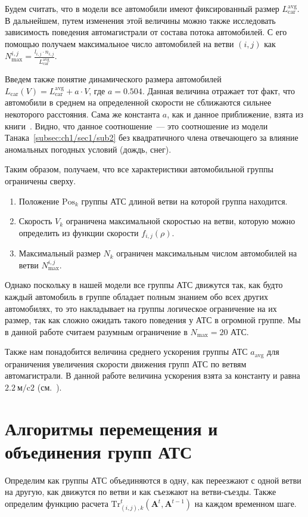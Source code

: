 Будем считать, что в модели все автомобили имеют фиксированный размер \(L_\text{car}^\text{avg}\).
В дальнейшем, путем изменения этой величины можно также исследовать зависимость поведения автомагистрали от состава потока автомобилей.
С его помощью получаем максимальное число автомобилей на ветви \((i,j)\) как \(N^{i,j}_\text{max} = \frac{l_{i,j} \cdot n_{i, j}}{L_\text{car}^\text{avg}}\).

Введем также понятие динамического размера автомобилей \(L_\text{car}(V) = L_\text{car}^\text{avg} + a\cdot V\), где \(a = 0.504\). 
Данная величина отражает тот факт, что автомобили в среднем на определенной скорости не сближаются сильнее некоторого расстояния. 
Сама же константа \(a\), как и данное приближение, взята из книги~\cite{gasn2017introd}.
Видно, что данное соотношение~--- это соотношение из модели Танака~\ref{subsec:ch1/sec1/sub2} без квадратичного члена отвечающего за влияние аномальных погодных условий (дождь, снег).

Таким образом, получаем, что все характеристики автомобильной группы ограничены сверху.
\begin{enumerate}
  \item Положение \(\mathrm{Pos}_k\) группы АТС длиной ветви на которой группа находится.
  \item Скорость \(V_k\) ограничена максимальной скоростью на ветви, которую можно определить из функции скорости $f_{i,j}(\rho)$.
  \item Максимальный размер \(N_k\) ограничен максимальным числом автомобилей на ветви \(N^{i,j}_\text{max}\).
\end{enumerate}

Однако поскольку в нашей модели все группы АТС движутся так, как будто каждый автомобиль в группе обладает полным знанием обо всех других автомобилях, то это накладывает на группы логическое ограничение на их размер, так как сложно ожидать такого поведения у АТС в огромной группе. 
Мы в данной работе считаем разумным ограничение в \(N_\text{max} = 20\) АТС.

Также нам понадобится величина среднего ускорения группы АТС \(a_\text{avg}\) для ограничения увеличения скорости движения групп АТС по ветвям автомагистрали. 
В данной работе величина ускорения взята за константу и равна \(2.2\ \text{м/c2}\) (см.~\cite{long2000acceleration}).


\section{Алгоритмы перемещения и объединения групп АТС}
\label{sec:calc_functions}
Определим как группы АТС объединяются в одну, как переезжают с одной ветви на другую, как движутся по ветви и как съезжают на ветви-съезды.
Также определим функцию расчета \(\text{Tr}_{(i, j), k}^t (\mathbf{A}^t, \mathbf{A}^{t-1})\) на каждом временном шаге.

